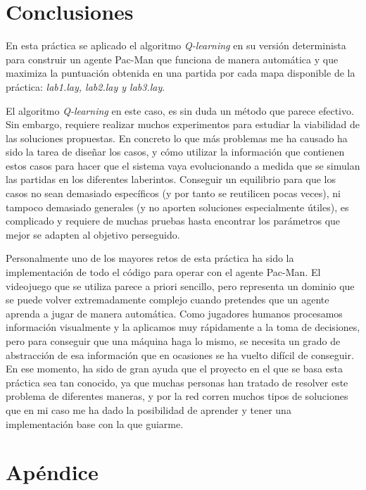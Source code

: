 \documentclass[11pt]{exam}
\begin{document}
\section{Conclusiones}\label{conclusiones}

En esta práctica se aplicado el algoritmo \textit{Q-learning} en su versión determinista para construir un agente Pac-Man que funciona de manera automática y que maximiza la puntuación obtenida en una partida por cada mapa disponible de la práctica: \textit{lab1.lay, lab2.lay y lab3.lay}.  
\vspace*{2mm}

El algoritmo \textit{Q-learning} en este caso, es sin duda un método que parece efectivo. Sin embargo, requiere realizar muchos experimentos para estudiar la viabilidad de las soluciones propuestas. En concreto lo que más problemas me ha causado ha sido la tarea de diseñar los casos, y cómo utilizar la información que contienen estos casos para hacer que el sistema vaya evolucionando a medida que se simulan las partidas en los diferentes laberintos. Conseguir un equilibrio para que los casos no sean demasiado específicos (y por tanto se reutilicen pocas veces), ni tampoco demasiado generales (y no aporten soluciones especialmente útiles), es complicado y requiere de muchas pruebas hasta encontrar los parámetros que mejor se adapten al objetivo perseguido.
\vspace*{2mm}

Personalmente uno de los mayores retos de esta práctica ha sido la implementación de todo el código para operar con el agente Pac-Man. El videojuego que se utiliza parece a priori sencillo, pero representa un dominio que se puede volver extremadamente complejo cuando pretendes que un agente aprenda a jugar de manera automática. Como jugadores humanos procesamos información visualmente y la aplicamos muy rápidamente a la toma de decisiones, pero para conseguir que una máquina haga lo mismo, se necesita un grado de abstracción de esa información que en ocasiones se ha vuelto difícil de conseguir. En ese momento, ha sido de gran ayuda que el proyecto en el que se basa esta práctica sea tan conocido, ya que muchas personas han tratado de resolver este problema de diferentes maneras, y por la red corren muchos tipos de soluciones que en mi caso me ha dado la posibilidad de aprender y tener una implementación base con la que guiarme.

\section{Apéndice}\label{apendice}
\end{document}
